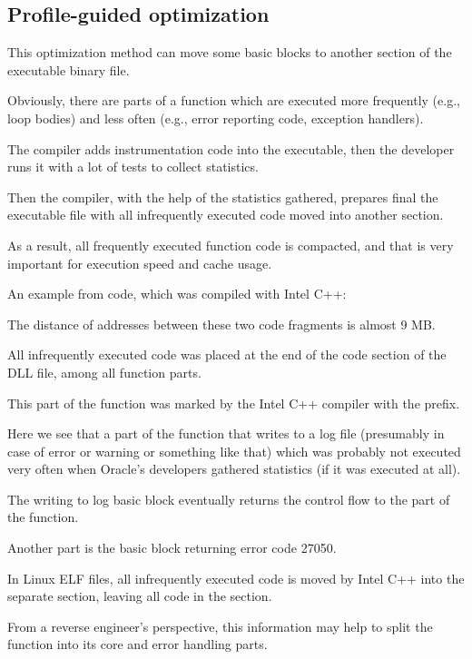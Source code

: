 

\subsection{Profile-guided optimization}
\label{PGO}

\myindex{\oracle}

This optimization method can move some \gls{basic block}s to another section of the executable binary file.

Obviously, there are parts of a function which are executed more frequently (e.g., loop bodies)
and less often (e.g., error reporting code, exception handlers).

The compiler adds instrumentation code into the executable, then the developer runs it with
a lot of tests to collect statistics.

Then the compiler, with the help of the statistics gathered,
prepares final the executable file with all infrequently executed code moved into another section.

As a result, all frequently executed function code is compacted, and that is very important
for execution speed and cache usage.

An example from \oracle code, which was compiled with Intel C++:



The distance of addresses between these two code fragments is almost 9 MB.

All infrequently executed code was placed at the end of the code section of the DLL file,
among all function parts.

This part of the function was marked by the Intel C++ compiler with the  prefix.

Here we see that a part of the function that writes to a log file (presumably in case of error or warning
or something like that) which was probably not executed very often when Oracle's developers gathered 
statistics (if it was executed at all).

The writing to log basic block eventually returns the control flow to the  part of the function.

Another  part is the \gls{basic block} returning error code 27050.

In Linux ELF files, all infrequently executed code is moved by Intel C++ into the separate 
 section, leaving all  code in the  section.

From a reverse engineer's perspective, this information may help to split the function
into its core and error handling parts.
